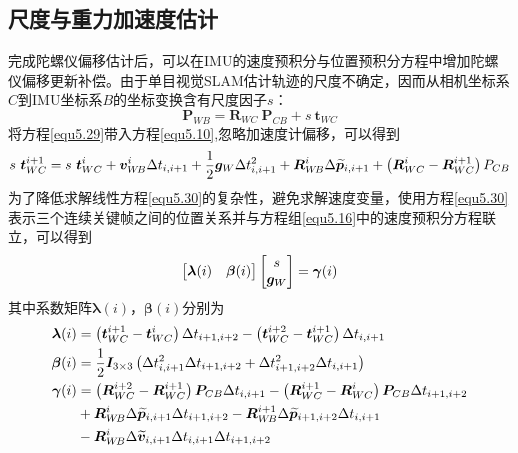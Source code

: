 \subsection{尺度与重力加速度估计}
完成陀螺仪偏移估计后，可以在IMU的速度预积分与位置预积分方程中增加陀螺仪偏移更新补偿。由于单目视觉SLAM估计轨迹的尺度不确定，因而从相机坐标系$C$到IMU坐标系$B$的坐标变换含有尺度因子$s$：
\begin{equation}
\label{equ5.29}
\boldsymbol{P}_{W\!B} = \boldsymbol{R}_{WC}\ \boldsymbol{P}_{CB} + s\ \boldsymbol{t}_{WC} 
\end{equation}
将方程\eqref{equ5.29}带入方程\eqref{equ5.10},忽略加速度计偏移，可以得到
\begin{equation}
\label{equ5.30}
s\ \boldsymbol{t}_{WC}^{i+1} = s\ \boldsymbol{t}_{WC}^i + \boldsymbol{v}_{W\!B}^i \Delta t_{i,i+1}+{1 \over 2} \boldsymbol{g}_W \Delta t_{i,i+1}^2 + \boldsymbol{R}_{W\!B}^i \Delta  \widetilde{\boldsymbol{p}}_{i,i+1} + \left(\boldsymbol{R}_{WC}^i-\boldsymbol{R}_{WC}^{i+1} \right) P_{CB}
\end{equation}
为了降低求解线性方程\eqref{equ5.30}的复杂性，避免求解速度变量，使用方程\eqref{equ5.30}表示三个连续关键帧之间的位置关系并与方程组\eqref{equ5.16}中的速度预积分方程联立，可以得到
\begin{equation}
\label{equ5.31} 
\begin{bmatrix}
\boldsymbol{\lambda}(i) & \boldsymbol{\beta}(i) \cr 
\end{bmatrix} 
\begin{bmatrix}
s \cr
\boldsymbol{g}_W \cr
\end{bmatrix}
= \boldsymbol{\gamma}(i)
\end{equation}
其中系数矩阵$\boldsymbol{\lambda}(i)$，$\boldsymbol{\beta}(i)$分别为
\begin{equation}
\label{equ5.32}
\begin{aligned}
\boldsymbol{\lambda}(i) &= \left( \boldsymbol{t}_{WC}^{i+1}-\boldsymbol{t}_{WC}^i \right) \Delta t_{i+1,i+2} - \left( \boldsymbol{t}_{WC}^{i+2}-\boldsymbol{t}_{WC}^{i+1} \right)\Delta t_{i,i+1} 
\\ 
\boldsymbol{\beta} (i) &= {1 \over 2} \boldsymbol{I}_{3 \times 3} \left( \Delta t_{i,i+1}^2 \Delta t_{i+1,i+2} + \Delta t_{i+1,i+2}^2 \Delta t_{i,i+1} \right) 
\\ 
\boldsymbol{\gamma} (i) &=  \left( \boldsymbol{R}_{WC}^{i+2} - \boldsymbol{R}_{WC}^{i+1} \right) \boldsymbol{P}_{CB} \Delta t_{i,i+1} - \left( \boldsymbol{R}_{WC}^{i+1} - \boldsymbol{R}_{WC}^{i} \right) \boldsymbol{P}_{CB} \Delta t_{i+1,i+2}  \\ 
& + \boldsymbol{R}_{W\!B}^{i} \Delta \widetilde{\boldsymbol{p}}_{i,i+1} \Delta t_{i+1,i+2} - \boldsymbol{R}_{W\!B}^{i+1} \Delta \widetilde{\boldsymbol{p}}_{i+1,i+2} \Delta t_{i,i+1} 			
\\
& - \boldsymbol{R}_{W\!B}^{i} \Delta \widetilde{\boldsymbol{v}}_{i,i+1} \Delta t_{i,i+1} \Delta t_{i+1,i+2}
\end{aligned}
\end{equation}
